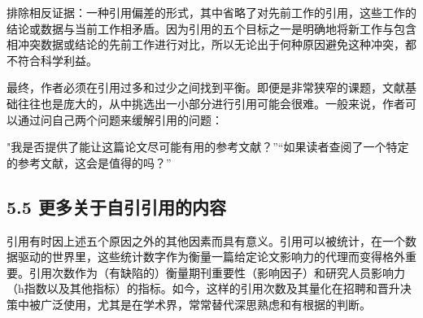 排除相反证据：一种引用偏差的形式，其中省略了对先前工作的引用，这些工作的结论或数据与当前工作相矛盾。因为引用的五个目标之一是明确地将新工作与包含相冲突数据或结论的先前工作进行对比，所以无论出于何种原因避免这种冲突，都不符合科学利益。

最终，作者必须在引用过多和过少之间找到平衡。即便是非常狭窄的课题，文献基础往往也是庞大的，从中挑选出一小部分进行引用可能会很难。一般来说，作者可以通过问自己两个问题来缓解引用的问题：

"我是否提供了能让这篇论文尽可能有用的参考文献？”“如果读者查阅了一个特定的参考文献，这会是值得的吗？”

\subsection*{5.5 更多关于自引引用的内容}
引用有时因上述五个原因之外的其他因素而具有意义。引用可以被统计，在一个数据驱动的世界里，这些统计数字作为衡量一篇给定论文影响力的代理而变得格外重要。引用次数作为（有缺陷的）衡量期刊重要性（影响因子）和研究人员影响力（h指数以及其他指标）的指标。如今，这样的引用次数及其量化在招聘和晋升决策中被广泛使用，尤其是在学术界，常常替代深思熟虑和有根据的判断。

